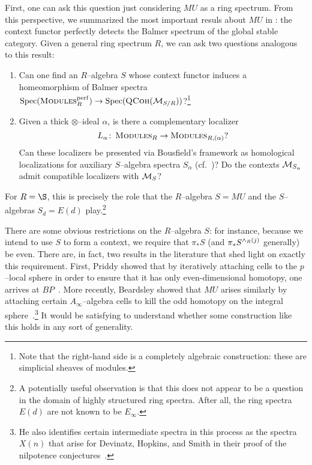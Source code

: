 First, one can ask this question just considering \(MU\) as a ring spectrum.  From this perspective, we summarized the most important resuls about \(MU\) in : the context functor perfectly detects the Balmer spectrum of the global stable category.  Given a general ring spectrum \(R\), we can ask two questions analogous to this result:
\begin{enumerate}
\item Can one find an \(R\)--algebra \(S\) whose context functor induces a homeomorphism of Balmer spectra \(\operatorname{Spec}(\normalfont\textsc{Modules}_R^{\mathrm{perf}}) \to \operatorname{Spec}(\normalfont\textsc{QCoh}(\mathcal{M}_{S/R}))\)?\footnote{Note that the right-hand side is a completely algebraic construction: these are simplicial sheaves of modules.}
\item Given a thick \(\otimes\)--ideal \(\alpha\), is there a complementary localizer \[L_\alpha\colon\thinspace \normalfont\textsc{Modules}_R \to \normalfont\textsc{Modules}_{R,(\alpha)}?\]  Can these localizers be presented via Bousfield's framework as homological localizations for auxiliary \(S\)--algebra spectra \(S_\alpha\) (cf.\ )?  Do the contexts \(\mathcal{M}_{S_\alpha}\) admit compatible localizers with \(\mathcal{M}_{S}\)?
\end{enumerate}
For \(R = \S\), this is precisely the role that the \(R\)--algebra \(S = MU\) and the \(S\)--algebras \(S_d = E(d)\) play.\footnote{A potentially useful observation is that this does not appear to be a question in the domain of highly structured ring spectra.  After all, the ring spectra \(E(d)\) are not known to be \(E_\infty\).}

There are some obvious restrictions on the \(R\)--algebra \(S\): for instance, because we intend to use \(S\) to form a context, we require that \(\pi_* S\) (and \(\pi_* S^{\wedge_R (j)}\) generally) be even.  There are, in fact, two results in the literature that shed light on exactly this requirement.  First, Priddy showed that by iteratively attaching cells to the \(p\)--local sphere in order to ensure that it has only even-dimensional homotopy, one arrives at \(BP\)~\cite{Priddy}.  More recently, Beardsley showed that \(MU\) arises similarly by attaching certain \(A_\infty\)--algebra cells to kill the odd homotopy on the integral sphere~\cite{Beardsley}.\footnote{He also identifies certain intermediate spectra in this process as the spectra \(X(n)\) that arise for Devinatz, Hopkins, and Smith in their proof of the nilpotence conjectures~\cite{DHS}.}  It would be satisfying to understand whether some construction like this holds in any sort of generality.

